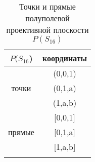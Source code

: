 
\begin{wraptable}{l}{4.0cm}
\caption{Точки и прямые полуполевой проективной плоскости $P(S_{16})$}
\label{tab:Stepanuk-1-tab-2}
\begin{tabular}{cc}
\toprule
$P(S_{16}$)                             & координаты  \\
\midrule
\multicolumn{1}{c}{\multirow{3}{*}{точки}} & (0,0,1)     \\
\multicolumn{1}{c}{}                       & (0,1,a)     \\
\multicolumn{1}{c}{}                       & (1,a,b)     \\
\multirow{3}{*}{прямые}                    & {[}0,0,1{]} \\
                                           & {[}0,1,a{]} \\
                                           & {[}1,a,b{]} \\\bottomrule\\
\end{tabular}
\end{wraptable}
